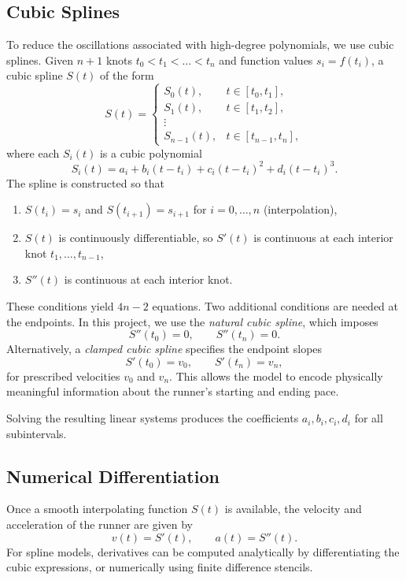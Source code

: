 \documentclass[12pt]{article}
\begin{document}
\subsection{Cubic Splines}
To reduce the oscillations associated with high-degree polynomials, we use cubic splines. Given $n+1$ knots $t_0<t_1<\dots< t_n$ and function values $s_i = f(t_i)$, a cubic spline $S(t)$ of the form
\begin{equation}
S(t) =
\begin{cases}
S_0(t), & t \in [t_0,t_1], \\
S_1(t), & t \in [t_1,t_2], \\
\vdots \\
S_{n-1}(t), & t \in [t_{n-1},t_n],
\end{cases}
\end{equation}
where each $S_i(t)$ is a cubic polynomial
\begin{equation}
S_i(t) = a_i + b_i (t - t_i) + c_i (t - t_i)^2 + d_i (t - t_i)^3.
\end{equation}
The spline is constructed so that
\begin{enumerate}
\item $S(t_i) = s_i$ and $S(t_{i+1}) = s_{i+1}$ for $i = 0,\dots,n$ (interpolation),
\item $S(t)$ is continuously differentiable, so $S'(t)$ is continuous at
      each interior knot $t_1,\dots,t_{n-1}$,
\item $S''(t)$ is continuous at each interior knot.
\end{enumerate}
These conditions yield $4n-2$ equations. Two additional conditions are
needed at the endpoints. In this project, we use the \emph{natural
cubic spline}, which imposes
\begin{equation}
S''(t_0) = 0, \qquad S''(t_n) = 0.
\label{eq:natural_bc}
\end{equation}
Alternatively, a \emph{clamped cubic spline} specifies the endpoint slopes
\begin{equation}
S'(t_0) = v_0, \qquad S'(t_n) = v_n,
\label{eq:clamped_bc}
\end{equation}
for prescribed velocities $v_0$ and $v_n$. This allows the model to encode physically meaningful information about the runner's starting and ending pace.

Solving the resulting linear systems produces the coefficients
$a_i,b_i,c_i,d_i$ for all subintervals.

\subsection{Numerical Differentiation}
Once a smooth interpolating function $S(t)$ is available, the velocity
and acceleration of the runner are given by
\begin{equation}
v(t) = S'(t), \qquad a(t) = S''(t).
\label{eq:vel_acc}
\end{equation}
For spline models, derivatives can be computed analytically by
differentiating the cubic expressions, or numerically using finite
difference stencils.
\end{document}
